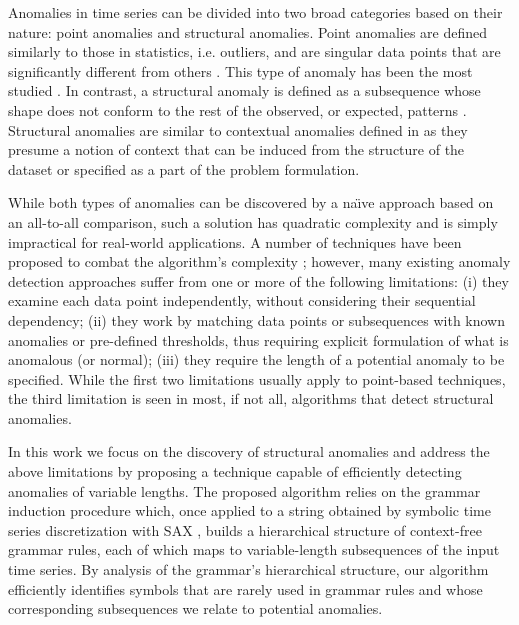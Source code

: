 \documentclass{llncs}
\begin{document}
Anomalies in time series can be divided into two broad categories based on their nature: point anomalies and structural anomalies. Point anomalies are defined similarly to those in statistics, i.e. outliers, and are singular data points that are significantly different from others \cite{hawkins}. This type of anomaly has been the most studied \cite{chan_anomaly}. In contrast, a structural anomaly is defined as a subsequence whose shape does not conform to the rest of the observed, or expected, patterns \cite{hot_sax, outliers_survey}. Structural anomalies are similar to contextual anomalies defined in \cite{chan_anomaly} as they presume a notion of context that can be induced from the structure of the dataset or specified as a part of the problem formulation.

While both types of anomalies can be discovered by a na\"{\i}ve approach based on an all-to-all comparison, such a solution has quadratic complexity and is simply impractical for real-world applications. A number of techniques have been proposed to combat the algorithm's complexity \cite{outliers_survey, chan_anomaly}; however, many existing anomaly detection approaches suffer from one or more of the following limitations: (i) they examine each data point independently, without considering their sequential dependency; (ii) they work by matching data points or subsequences with known anomalies or pre-defined thresholds, thus requiring explicit formulation of what is anomalous (or normal); (iii) they require the length of a potential anomaly to be specified. While the first two limitations usually apply to point-based techniques, the third limitation is seen in most, if not all, algorithms that detect structural anomalies. 

In this work we focus on the discovery of structural anomalies and address the above limitations by proposing a technique capable of efficiently detecting anomalies of variable lengths. The proposed algorithm relies on the grammar induction procedure which, once applied to a string obtained by symbolic time series discretization with SAX \cite{sax}, builds a hierarchical structure of context-free grammar rules, each of which maps to variable-length subsequences of the input time series. By analysis of the grammar's hierarchical structure, our algorithm efficiently identifies symbols that are rarely used in grammar rules and whose corresponding subsequences we relate to potential anomalies. 
\end{document}
